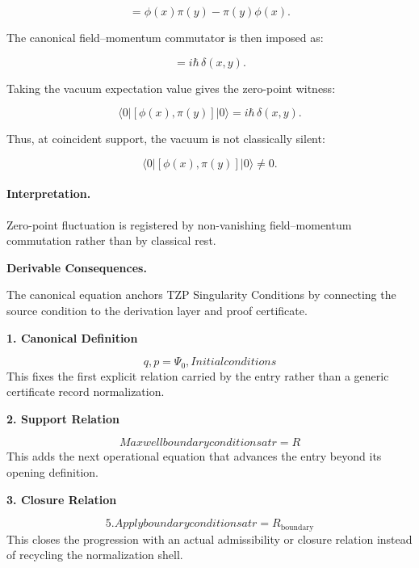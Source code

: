 \begin{equation}
[\phi(x),\pi(y)]
=
\phi(x)\pi(y)-\pi(y)\phi(x).
\end{equation}

The canonical field--momentum commutator is then imposed as:

\begin{equation}
[\phi(x),\pi(y)] = i\hbar\,\delta(x,y).
\end{equation}

Taking the vacuum expectation value gives the zero-point witness:

\begin{equation}
\langle 0|[\phi(x),\pi(y)]|0\rangle
=
i\hbar\,\delta(x,y).
\end{equation}

Thus, at coincident support, the vacuum is not classically silent:

\begin{equation}
\boxed{
\langle 0|[\phi(x),\pi(y)]|0\rangle \neq 0 .
}
\end{equation}

\paragraph{Interpretation.}
Zero-point fluctuation is registered by non-vanishing field--momentum commutation rather than by classical rest.

\par\vspace{0.35em}
\noindent\textbf{Derivable Consequences.}\quad
\begingroup
\footnotesize
\raggedright
The canonical equation anchors TZP Singularity Conditions by connecting the source condition to the derivation layer and proof certificate.
\par\endgroup

\noindent\textbf{1. Canonical Definition}\par
\[
{q, p} = \Psi_0, Initial conditions
\]
\noindent This fixes the first explicit relation carried by the entry rather than a generic certificate record normalization.\par
\noindent\textbf{2. Support Relation}\par
\[
Maxwell boundary conditions at r = R
\]
\noindent This adds the next operational equation that advances the entry beyond its opening definition.\par
\noindent\textbf{3. Closure Relation}\par
\[
5. Apply boundary conditions at r = R_{\mathrm{boundary}}
\]
\noindent This closes the progression with an actual admissibility or closure relation instead of recycling the normalization shell.\par

